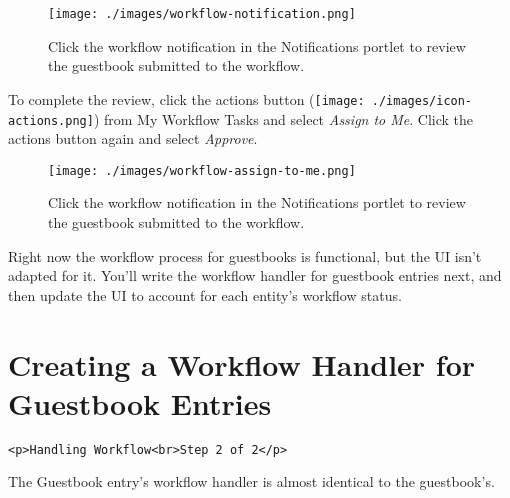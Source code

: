 \begin{figure}
\centering
\texttt{[image: ./images/workflow-notification.png]}
\caption{Click the workflow notification in the Notifications portlet to
review the guestbook submitted to the workflow.}
\end{figure}

To complete the review, click the actions button
(\texttt{[image: ./images/icon-actions.png]}) from My Workflow Tasks and
select \emph{Assign to Me}. Click the actions button again and select
\emph{Approve}.

\begin{figure}
\centering
\texttt{[image: ./images/workflow-assign-to-me.png]}
\caption{Click the workflow notification in the Notifications portlet to
review the guestbook submitted to the workflow.}
\end{figure}

Right now the workflow process for guestbooks is functional, but the UI
isn't adapted for it. You'll write the workflow handler for guestbook
entries next, and then update the UI to account for each entity's
workflow status.

\chapter{Creating a Workflow Handler for Guestbook
Entries}\label{creating-a-workflow-handler-for-guestbook-entries}

\begin{verbatim}
<p>Handling Workflow<br>Step 2 of 2</p>
\end{verbatim}

The Guestbook entry's workflow handler is almost identical to the
guestbook's.

